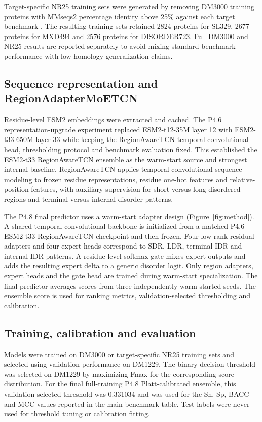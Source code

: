 \documentclass[namedate,webpdf,traditional,large]{oup-authoring-template}
\newcommand{\method}{RegionAdapterMoETCN}
\newcommand{\backbone}{RegionAwareTCN}
\begin{document}
Target-specific NR25 training sets were generated by removing DM3000 training proteins with MMseqs2 percentage identity above 25\% against each target benchmark \citep{steinegger2017mmseqs2}. The resulting training sets retained 2824 proteins for SL329, 2677 proteins for MXD494 and 2576 proteins for DISORDER723. Full DM3000 and NR25 results are reported separately to avoid mixing standard benchmark performance with low-homology generalization claims.

\subsection{Sequence representation and \method{}}

Residue-level ESM2 embeddings were extracted and cached. The P4.6 representation-upgrade experiment replaced ESM2-t12-35M layer 12 with ESM2-t33-650M layer 33 while keeping the \backbone{} temporal-convolutional head, thresholding protocol and benchmark evaluation fixed. This established the ESM2-t33 \backbone{} ensemble as the warm-start source and strongest internal baseline. \backbone{} applies temporal convolutional sequence modeling to frozen residue representations, residue one-hot features and relative-position features, with auxiliary supervision for short versus long disordered regions and terminal versus internal disorder patterns.

The P4.8 final predictor uses a warm-start adapter design (Figure~\ref{fig:method}). A shared temporal-convolutional backbone is initialized from a matched P4.6 ESM2-t33 \backbone{} checkpoint and then frozen. Four low-rank residual adapters and four expert heads correspond to SDR, LDR, terminal-IDR and internal-IDR patterns. A residue-level softmax gate mixes expert outputs and adds the resulting expert delta to a generic disorder logit. Only region adapters, expert heads and the gate head are trained during warm-start specialization. The final predictor averages scores from three independently warm-started seeds. The ensemble score is used for ranking metrics, validation-selected thresholding and calibration.

\subsection{Training, calibration and evaluation}

Models were trained on DM3000 or target-specific NR25 training sets and selected using validation performance on DM1229. The binary decision threshold was selected on DM1229 by maximizing Fmax for the corresponding score distribution. For the final full-training P4.8 Platt-calibrated ensemble, this validation-selected threshold was 0.331034 and was used for the Sn, Sp, BACC and MCC values reported in the main benchmark table. Test labels were never used for threshold tuning or calibration fitting.
\end{document}
